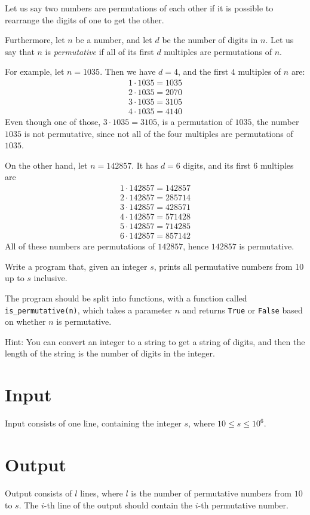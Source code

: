 
Let us say two numbers are permutations of each other
if it is possible to rearrange the digits of one to get the other.

Furthermore, let $n$ be a number, and let $d$ be the number of digits in $n$.
Let us say that $n$ is \emph{permutative} if all of its first $d$ multiples are permutations of $n$.

For example, let $n = 1035$.
Then we have $d = 4$, and the first $4$ multiples of $n$ are:
\begin{align*}
	1 \cdot 1035 = 1035 \\
	2 \cdot 1035 = 2070 \\
	3 \cdot 1035 = 3105 \\
	4 \cdot 1035 = 4140
\end{align*}
Even though one of those, $3 \cdot 1035 = 3105$, is a permutation of $1035$,
the number $1035$ is not permutative, since not all of the four multiples are permutations of $1035$.

On the other hand, let $n = 142857$.
It has $d = 6$ digits, and its first $6$ multiples are
\begin{align*}
	1 \cdot 142857 = 142857 \\
	2 \cdot 142857 = 285714 \\
	3 \cdot 142857 = 428571 \\
	4 \cdot 142857 = 571428 \\
	5 \cdot 142857 = 714285 \\
	6 \cdot 142857 = 857142
\end{align*}
All of these numbers are permutations of $142857$, hence $142857$ is permutative.

Write a program that, given an integer $s$, prints all permutative numbers from 10 up to $s$ inclusive.

The program should be split into functions,
with a function called \texttt{is\_permutative(n)},
which takes a parameter $n$
and returns \texttt{True} or \texttt{False} based on whether $n$ is permutative.

Hint: You can convert an integer to a string to get a string of digits,
and then the length of the string is the number of digits in the integer.

\section*{Input}
Input consists of one line, containing the integer $s$, where $10 \leq s \leq 10^6$.

\section*{Output}
Output consists of $l$ lines, where $l$ is the number of permutative numbers from $10$ to $s$.
The $i$-th line of the output should contain the $i$-th permutative number.
